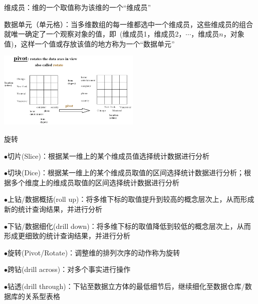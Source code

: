 \begin{solution}
维成员：维的一个取值称为该维的一个“维成员”

数据单元（单元格）：当多维数组的每一维都选中一个维成员，这些维成员的组合就唯一确定了一个观察对象的值，即\ (维成员1，维成员2，$\cdots$，维成员$n$，对象值)，这样一个值或存放该值的地方称为一个“数据单元”



\begin{table}
    \centering
    \includegraphics[width=6.8cm]{images/旋转.png}
    \caption*{旋转}
    \vspace{-3em}
\end{table}
$\bullet$切片(Slice)：根据某一维上的某个维成员值选择统计数据进行分析

$\bullet$切块(Dice)：根据某一维上的某个维成员取值的区间选择统计数据进行分析；根据多个维度上的维成员取值的区间选择统计数据进行分析

$\bullet$上钻/数据概括(roll up)：将多维下标的取值提升到较高的概念层次上，从而形成新的统计查询结果，并进行分析

$\bullet$下钻/数据细化(drill down)：将多维下标的取值降低到较低的概念层次上，从而形成更细致的统计查询结果，并进行分析

$\bullet$旋转(Pivot/Rotate)：调整维的排列次序的动作称为旋转

$\bullet$跨钻(drill across)：对多个事实进行操作

$\bullet$钻透(drill through)：下钻至数据立方体的最低细节后，继续细化至数据仓库/数据库的关系型表格
\end{solution}

